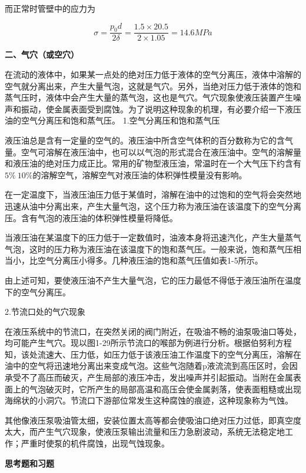 \noindent 而正常时管壁中的应力为

$$
\sigma =\frac{p_0d}{2\delta}=\frac{1.5\times 20.5}{2\times 1.05}=14.6MPa
$$


\textbf{ 二、气穴（或空穴）}

在流动的液体中，如果某一点处的绝对压力低于液体的空气分离压，液体中溶解的空气就分离出来，产生大量气泡，这就是气穴。另外，当绝对压力低于液体的饱和蒸气压时，液体中会产生大量的蒸气泡，这也是气穴。气穴现象使液压装置产生噪声和振动，使金属表面受到腐蚀。为了说明这种现象的机理，有必要介绍一下液压油的空气分离压和饱和蒸气压。
1.空气分离压和饱和蒸气压

液压油总是含有一定量的空气的。液压油中所含空气体积的百分数称为它的含气量。空气可溶解在液压油中，也可以以气泡的形式混合在液压油中。空气的溶解量和液压油的绝对压力成正比。常用的矿物型液压油，常温时在一个大气压下约含有$5\%~10\%$的溶解空气，溶解空气对液压油的体积弹性模量没有影响。

在一定温度下，当液压油压力低于某值时，溶解在油中的过饱和的空气将会突然地迅速从油中分离出来，产生大量气泡，这个压力称为液压油在该温度下的空气分离压。含有气泡的液压油的体积弹性模量将降低。

当液压油在某温度下的压力低于一定数值时，油液本身将迅速汽化，产生大量蒸气气泡，这时的压力称为液压油在该温度下的饱和蒸气压。一般来说，饱和蒸气压相当小，比空气分离压小得多。几种液压油的饱和蒸气压值如表1-5所示。



由上述可知，要使液压油不产生大量气泡，它的压力最低不得低于液压油所在温度下的空气分离压。

2.节流口处的气穴现象

在液压系统中的节流口，在突然关闭的阀门附近，在吸油不畅的油泵吸油口等处，均可能产生气穴。现以图1-29所示节流口的喉部为例进行分析。根据伯努利方程知，该处流速大、压力低，如压力低于该液压油工作温度下的空气分离压，溶解在油中的空气将迅速地分离出来变成气泡。这些气泡随着p液流流到高压区时，会因承受不了高压而破灭，产生局部的液压冲击，发出噪声并引起振动。当附在金属表面上的气泡破灭时，它所产生的局部高温和高压会使金属剥落，使表面粗糙或出现海绵状的小洞穴。节流口下游部位常发生这种腐蚀的痕迹，这种现象称为气蚀。

其他像液压泵吸油管太细，安装位置太高等都会使吸油口绝对压力过低，即真空度太大，而产生气穴现象，使液压泵输出流量和压力急剧波动，系统无法稳定地工作；严重时使泵的机件腐蚀，出现气蚀现象。

\begin{center}
 \textbf{思考题和习题}
\end{center}


